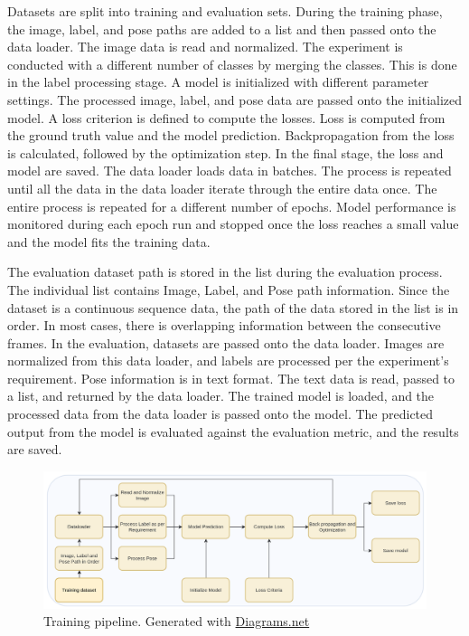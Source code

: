     Datasets are split into training and evaluation sets. During the training phase, the image, label, and pose paths are added to a list and then passed onto the data loader. The image data is read and normalized. The experiment is conducted with a different number of classes by merging the classes. This is done in the label processing stage. A model is initialized with different parameter settings. The processed image, label, and pose data are passed onto the initialized model. A loss criterion is defined to compute the losses. Loss is computed from the ground truth value and the model prediction. Backpropagation from the loss is calculated, followed by the optimization step. In the final stage, the loss and model are saved. The data loader loads data in batches. The process is repeated until all the data in the data loader iterate through the entire data once. The entire process is repeated for a different number of epochs. Model performance is monitored during each epoch run and stopped once the loss reaches a small value and the model fits the training data. 

	The evaluation dataset path is stored in the list during the evaluation process. The individual list contains Image, Label, and Pose path information. Since the dataset is a continuous sequence data, the path of the data stored in the list is in order. In most cases, there is overlapping information between the consecutive frames. In the evaluation, datasets are passed onto the data loader. Images are normalized from this data loader, and labels are processed per the experiment's requirement. Pose information is in text format. The text data is read, passed to a list, and returned by the data loader. The trained model is loaded, and the processed data from the data loader is passed onto the model. The predicted output from the model is evaluated against the evaluation metric, and the results are saved.      
    
    
   	\begin{figure}
    	\centering
    	\includegraphics[width=14cm]{images/training.png}
    	\caption{Training pipeline. Generated with \href{https://app.diagrams.net/}{Diagrams.net}}
    	\label{fig:unet_training}
    \end{figure}

